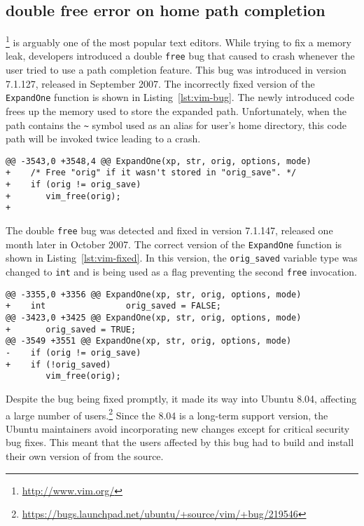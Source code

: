 \subsection{\vim double free error on home path completion}

\vim\footnote{\url{http://www.vim.org/}} is arguably one of the most popular
text editors. While trying to fix a memory leak, \vim developers introduced a
double \lstinline`free` bug that caused \vim to crash whenever the user tried to
use a path completion feature. This bug was introduced in version 7.1.127,
released in September 2007. The incorrectly fixed version of the
\lstinline`ExpandOne` function is shown in Listing~\ref{lst:vim-bug}. The newly
introduced code frees up the memory used to store the expanded path.
Unfortunately, when the path contains the \lstinline`~` symbol used as an alias for
user's home directory, this code path will be invoked twice leading to a crash.

\begin{lstlisting}[alsolanguage=diff,numbers=none,label=lst:vim-bug,caption={First (incorrect) fix of \lstinline`ExpandOne` function in \vim.}]
@@ -3543,0 +3548,4 @@ ExpandOne(xp, str, orig, options, mode)
+    /* Free "orig" if it wasn't stored in "orig_save". */
+    if (orig != orig_save)
+       vim_free(orig);
+
\end{lstlisting}

The double \lstinline`free` bug was detected and fixed in version 7.1.147, released
one month later in October 2007. The correct version of the \lstinline`ExpandOne`
function is shown in Listing~\ref{lst:vim-fixed}. In this version, the
\lstinline`orig_saved` variable type was changed to \lstinline`int` and is
being used as a flag preventing the second \lstinline`free` invocation.

\begin{lstlisting}[alsolanguage=diff,numbers=none,label=lst:vim-fixed,caption={Second (correct) fix \lstinline`ExpandOne` function in \vim.}]
@@ -3355,0 +3356 @@ ExpandOne(xp, str, orig, options, mode)
+    int                orig_saved = FALSE;
@@ -3423,0 +3425 @@ ExpandOne(xp, str, orig, options, mode)
+       orig_saved = TRUE;
@@ -3549 +3551 @@ ExpandOne(xp, str, orig, options, mode)
-    if (orig != orig_save)
+    if (!orig_saved)
        vim_free(orig);
\end{lstlisting}

Despite the bug being fixed promptly, it made its way into Ubuntu 8.04,
affecting a large number of
users.\footnote{\url{https://bugs.launchpad.net/ubuntu/+source/vim/+bug/219546}}
Since the 8.04 is a long-term support version, the Ubuntu maintainers avoid
incorporating new changes except for critical security bug fixes. This meant
that the \vim users affected by this bug had to build and install their own
version of \vim from the source.

